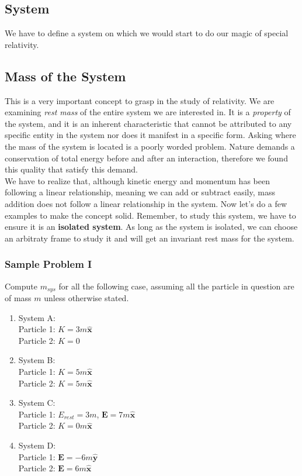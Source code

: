 \documentclass[12pt]{book}
\begin{document}
\subsection{System}
We have to define a system on which we would start to do our magic of special relativity.

\subsection{Mass of the System} 
This is a very important concept to grasp in the study of relativity. We are examining \textit{rest mass} of the entire system we are interested in. It is a \textit{property} of the system, and it is an inherent characteristic that cannot be attributed to any specific entity in the system nor does it manifest in a specific form. Asking where the mass of the system is located is a poorly worded problem. Nature demands a conservation of total energy before and after an interaction, therefore we found this quality that satisfy this demand.\\
\newline
We have to realize that, although kinetic energy and momentum has been following a linear relationship, meaning we can add or subtract easily, mass addition does not follow a linear relationship in the system. Now let's do a few examples to make the concept solid. Remember, to study this system, we have to ensure it is an \textbf{isolated system}. As long as the system is isolated, we can choose an arbitraty frame to study it and will get an invariant rest mass for the system.  \\
\subsubsection{Sample Problem I}
Compute $m_{sys}$ for all the following case, assuming all the particle in question are of mass $m$ unless otherwise stated.
\begin{enumerate}
    \item System A: \\
    Particle 1: \(K = 3m \hat{\textbf{x}}\)\\
    Particle 2: \(K = 0\)
    \item System B:\\
    Particle 1: \(K = 5m \hat{\textbf{x}}\)\\
    Particle 2: \(K = 5m \hat{\textbf{x}}\)
    \item System C:\\
    Particle 1: \(E_{rest} = 3m\), \(\textbf{E} = 7m \hat{\textbf{x}}\)\\
    Particle 2: \(K = 0m \hat{\textbf{x}}\)
    \item System D:\\
    Particle 1: \(\textbf{E}=-6m\hat{\textbf{y}}\)\\
    Particle 2: \(\textbf{E}=6m\hat{\textbf{x}}\)
\end{enumerate}
\end{document}
